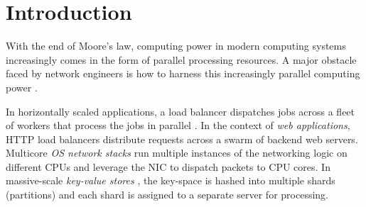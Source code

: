 \section{Introduction}\label{sec:introduction}










With the end of Moore's law, computing power in modern computing systems increasingly comes in the form of parallel processing resources.  A major obstacle faced by network engineers is how to harness this increasingly parallel computing power \cite{265065, 10.5555/3307441.3307467, 10.1145/2815400.2815423, 10.1145/3098822.3098826, 10.5555/3154630.3154639}.

In horizontally scaled applications, a load balancer dispatches jobs across a fleet of workers that process the jobs in parallel \cite{10.5555/3235491}.  In the context of \emph{web applications}, HTTP load balancers \cite{194966, 211279, 9552525} distribute requests across a swarm of backend web servers.  %
Multicore \emph{OS network stacks} \cite{211263, 10.1145/3359989.3365412, 10.1145/3452296.3472914} run multiple instances of the networking logic on different CPUs and leverage the NIC to dispatch packets to CPU cores. %
In massive-scale \emph{key-value stores} \cite{ghigoff2021bmc}, the key-space is hashed into multiple shards (partitions) and each shard is assigned to a separate server for processing.


